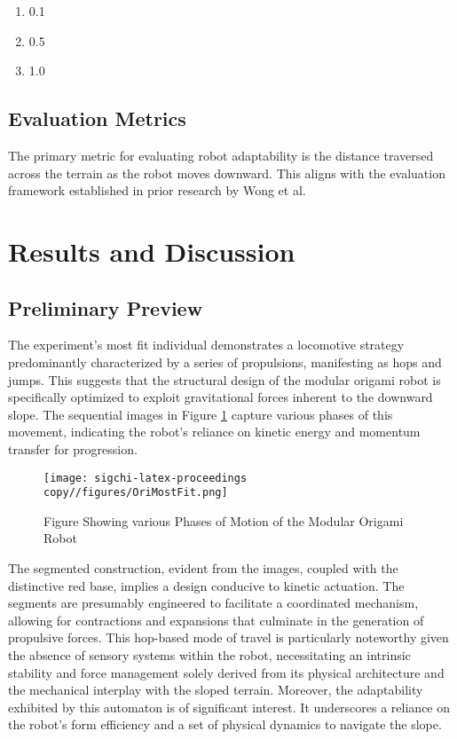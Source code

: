 \documentclass{sigchi}
\begin{document}
\begin{enumerate}
    \item 0.1

    \item 0.5

    \item 1.0
\end{enumerate}

\subsection{Evaluation Metrics}

The primary metric for evaluating robot adaptability is the distance traversed across the terrain as the robot moves downward. This aligns with the evaluation framework established in prior research by Wong et al\cite{wong2002performance}.

 
 

\section{Results and Discussion}
\subsection{Preliminary Preview}

The experiment's most fit individual demonstrates a locomotive strategy predominantly characterized by a series of propulsions, manifesting as hops and jumps. This suggests that the structural design of the modular origami robot is specifically optimized to exploit gravitational forces inherent to the downward slope. The sequential images in Figure \ref{fig:Most Fit Modular Origami Robot} capture various phases of this movement, indicating the robot's reliance on kinetic energy and momentum transfer for progression.

\begin{figure}[h!]
    \centering
    \texttt{[image: sigchi-latex-proceedings copy//figures/OriMostFit.png]}
    \caption{Figure Showing various Phases of Motion of the Modular Origami Robot}
    \label{fig:Most Fit Modular Origami Robot}
\end{figure}

The segmented construction, evident from the images, coupled with the distinctive red base, implies a design conducive to kinetic actuation. The segments are presumably engineered to facilitate a coordinated mechanism, allowing for contractions and expansions that culminate in the generation of propulsive forces. This hop-based mode of travel is particularly noteworthy given the absence of sensory systems within the robot, necessitating an intrinsic stability and force management solely derived from its physical architecture and the mechanical interplay with the sloped terrain. Moreover, the adaptability exhibited by this automaton is of significant interest. It underscores a reliance on the robot's form efficiency and a set of physical dynamics to navigate the slope. 
\end{document}
